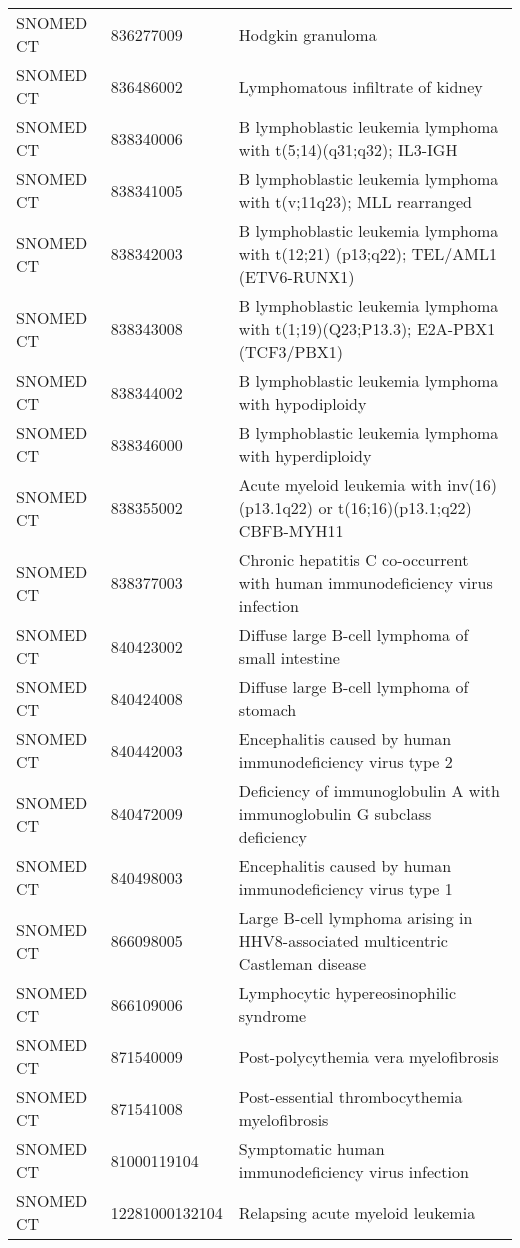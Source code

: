 \begin{table}[ht]
\begin{tabular}{lll}
  SNOMED CT & 836277009 & Hodgkin granuloma \\ 
  SNOMED CT & 836486002 & Lymphomatous infiltrate of kidney \\ 
  SNOMED CT & 838340006 & B lymphoblastic leukemia lymphoma with t(5;14)(q31;q32); IL3-IGH \\ 
  SNOMED CT & 838341005 & B lymphoblastic leukemia lymphoma with t(v;11q23); MLL rearranged \\ 
  SNOMED CT & 838342003 & B lymphoblastic leukemia lymphoma with t(12;21) (p13;q22); TEL/AML1 (ETV6-RUNX1) \\ 
  SNOMED CT & 838343008 & B lymphoblastic leukemia lymphoma with t(1;19)(Q23;P13.3); E2A-PBX1 (TCF3/PBX1) \\ 
  SNOMED CT & 838344002 & B lymphoblastic leukemia lymphoma with hypodiploidy \\ 
  SNOMED CT & 838346000 & B lymphoblastic leukemia lymphoma with hyperdiploidy \\ 
  SNOMED CT & 838355002 & Acute myeloid leukemia with inv(16)(p13.1q22) or t(16;16)(p13.1;q22) CBFB-MYH11 \\ 
  SNOMED CT & 838377003 & Chronic hepatitis C co-occurrent with human immunodeficiency virus infection \\ 
  SNOMED CT & 840423002 & Diffuse large B-cell lymphoma of small intestine \\ 
  SNOMED CT & 840424008 & Diffuse large B-cell lymphoma of stomach \\ 
  SNOMED CT & 840442003 & Encephalitis caused by human immunodeficiency virus type 2 \\ 
  SNOMED CT & 840472009 & Deficiency of immunoglobulin A with immunoglobulin G subclass deficiency \\ 
  SNOMED CT & 840498003 & Encephalitis caused by human immunodeficiency virus type 1 \\ 
  SNOMED CT & 866098005 & Large B-cell lymphoma arising in HHV8-associated multicentric Castleman disease \\ 
  SNOMED CT & 866109006 & Lymphocytic hypereosinophilic syndrome \\ 
  SNOMED CT & 871540009 & Post-polycythemia vera myelofibrosis \\ 
  SNOMED CT & 871541008 & Post-essential thrombocythemia myelofibrosis \\ 
  SNOMED CT & 81000119104 & Symptomatic human immunodeficiency virus infection \\ 
  SNOMED CT & 12281000132104 & Relapsing acute myeloid leukemia \\ 

\end{tabular}
\end{table}
